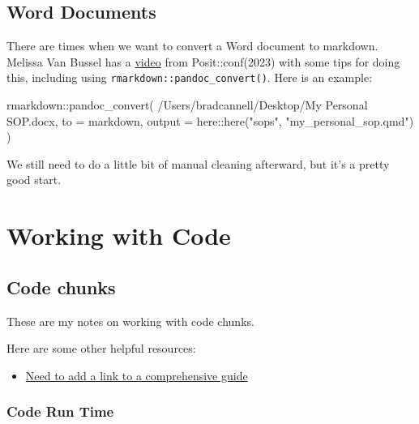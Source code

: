 \documentclass[
  letterpaper,
  DIV=11,
  numbers=noendperiod]{scrreprt}
\newenvironment{Shaded}{\begin{snugshade}}{\end{snugshade}}
\newcommand{\AttributeTok}[1]{\textcolor[rgb]{0.40,0.45,0.13}{#1}}
\newcommand{\FunctionTok}[1]{\textcolor[rgb]{0.28,0.35,0.67}{#1}}
\newcommand{\NormalTok}[1]{\textcolor[rgb]{0.00,0.23,0.31}{#1}}
\newcommand{\SpecialCharTok}[1]{\textcolor[rgb]{0.37,0.37,0.37}{#1}}
\newcommand{\StringTok}[1]{\textcolor[rgb]{0.13,0.47,0.30}{#1}}
\providecommand{\tightlist}{%
  \setlength{\itemsep}{0pt}\setlength{\parskip}{0pt}}\usepackage{longtable,booktabs,array}
\begin{document}
\chapter{Word Documents}\label{word-documents}

There are times when we want to convert a Word document to markdown.
Melissa Van Bussel has a \href{https://www.youtube.com/@ggnot2}{video}
from Posit::conf(2023) with some tips for doing this, including using
\texttt{rmarkdown::pandoc\_convert()}. Here is an example:

\begin{Shaded}
\begin{Highlighting}[]
\NormalTok{rmarkdown}\SpecialCharTok{::}\FunctionTok{pandoc\_convert}\NormalTok{(}
  \StringTok{\textquotesingle{}/Users/bradcannell/Desktop/My Personal SOP.docx\textquotesingle{}}\NormalTok{, }
  \AttributeTok{to =} \StringTok{\textquotesingle{}markdown\textquotesingle{}}\NormalTok{,}
  \AttributeTok{output =}\NormalTok{ here}\SpecialCharTok{::}\FunctionTok{here}\NormalTok{(}\StringTok{"sops"}\NormalTok{, }\StringTok{"my\_personal\_sop.qmd"}\NormalTok{)}
\NormalTok{)}
\end{Highlighting}
\end{Shaded}

We still need to do a little bit of manual cleaning afterward, but it's
a pretty good start.

\part{Working with Code}

\chapter{Code chunks}\label{sec-code-chunks}

These are my notes on working with code chunks.

Here are some other helpful resources:

\begin{itemize}
\tightlist
\item
  \href{www.example.com}{Need to add a link to a comprehensive guide}
\end{itemize}

\section{Code Run Time}\label{code-run-time}
\end{document}

